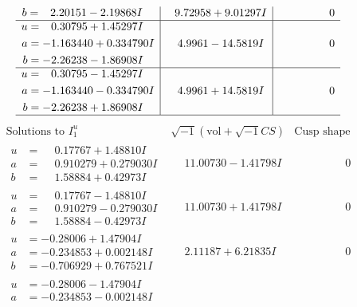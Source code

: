 \documentclass[1p]{elsarticle_modified}
\theoremstyle{definition}
\newcommand{\I}{\sqrt{-1}}
\begin{document}
$$\begin{array}{c|c|c}
\begin{aligned}
b &= \phantom{-}2.20151 - 2.19868 I\end{aligned}
 & \phantom{-}9.72958 + 9.01297 I & \phantom{-0.000000 } 0 \\ \hline\begin{aligned}
u &= \phantom{-}0.30795 + 1.45297 I \\
a &= -1.163440 + 0.334790 I \\
b &= -2.26238 - 1.86908 I\end{aligned}
 & \phantom{-}4.9961 - 14.5819 I & \phantom{-0.000000 } 0 \\ \hline\begin{aligned}
u &= \phantom{-}0.30795 - 1.45297 I \\
a &= -1.163440 - 0.334790 I \\
b &= -2.26238 + 1.86908 I\end{aligned}
 & \phantom{-}4.9961 + 14.5819 I & \phantom{-0.000000 } 0\\
 \hline 
 \end{array}$$\newpage$$\begin{array}{c|c|c}  
\text{Solutions to }I^u_{1}& \I (\text{vol} + \sqrt{-1}CS) & \text{Cusp shape}\\
 \hline 
\begin{aligned}
u &= \phantom{-}0.17767 + 1.48810 I \\
a &= \phantom{-}0.910279 + 0.279030 I \\
b &= \phantom{-}1.58884 + 0.42973 I\end{aligned}
 & \phantom{-}11.00730 - 1.41798 I & \phantom{-0.000000 } 0 \\ \hline\begin{aligned}
u &= \phantom{-}0.17767 - 1.48810 I \\
a &= \phantom{-}0.910279 - 0.279030 I \\
b &= \phantom{-}1.58884 - 0.42973 I\end{aligned}
 & \phantom{-}11.00730 + 1.41798 I & \phantom{-0.000000 } 0 \\ \hline\begin{aligned}
u &= -0.28006 + 1.47904 I \\
a &= -0.234853 + 0.002148 I \\
b &= -0.706929 + 0.767521 I\end{aligned}
 & \phantom{-}2.11187 + 6.21835 I & \phantom{-0.000000 } 0 \\ \hline\begin{aligned}
u &= -0.28006 - 1.47904 I \\
a &= -0.234853 - 0.002148 I \\

\end{aligned}
\end{array}$$
\end{document}
